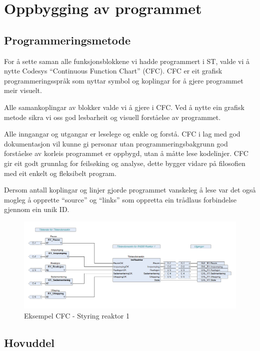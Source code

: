 \newpage
\section{Oppbygging av programmet}
\thispagestyle{fancy}

\subsection{Programmeringsmetode}
For å sette saman alle funksjonsblokkene vi hadde programmert i \gls{ST}, valde vi å nytte \gls{Codesys} \newline ``Continuous Function Chart'' (\gls{CFC}).
\gls{CFC} er eit grafisk programmeringsspråk som nyttar symbol og koplingar for å gjere programmet meir visuelt.

Alle samankoplingar av blokker valde vi å gjere i \gls{CFC}. Ved å nytte ein grafisk metode sikra vi oss god lesbarheit og
visuell forståelse av programmet. 

Alle inngangar og utgangar er leselege og enkle og forstå. \gls{CFC} i lag med god dokumentasjon vil kunne gi personar utan programmeringsbakgrunn
god forståelse av korleis programmet er oppbygd, utan å måtte lese kodelinjer.
\gls{CFC} gir eit godt grunnlag for feilsøking og analyse, dette bygger vidare på filosofien med eit enkelt og fleksibelt program.

Dersom antall koplingar og linjer gjorde programmet vanskeleg å lese var det også
mogleg å opprette ``source'' og ``links'' som oppretta ein trådlaus forbindelse gjennom ein unik ID.

\begin{figure}[htbp]
    \centering
    \includegraphics[width=1\textwidth]{Bilder/ReaktorPRG.png}
    \caption{Eksempel \gls{CFC} - Styring reaktor 1}\label{fig:CFCReaktor}
\end{figure}

\newpage

\subsection{Hovuddel}

